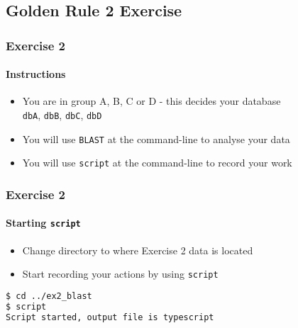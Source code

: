 %

\subsection{Golden Rule 2 Exercise}
\begin{frame}
  \frametitle{Exercise 2}
  \framesubtitle{Instructions}    
  \begin{itemize}
    \item You are in group A, B, C or D - this decides your database\\
    \texttt{dbA}, \texttt{dbB}, \texttt{dbC}, \texttt{dbD}
    \item You will use \texttt{BLAST} at the command-line to analyse your data
    \item You will use \texttt{script} at the command-line to record your work
  \end{itemize}
\end{frame}

\begin{frame}[fragile]
  \frametitle{Exercise 2}
  \framesubtitle{Starting \texttt{script}}    
  \begin{itemize}
    \item Change directory to where Exercise 2 data is located
    \item Start recording your actions by using \texttt{script}
  \end{itemize}
\begin{lstlisting}[language=bash]
$ cd ../ex2_blast
$ script
Script started, output file is typescript
\end{lstlisting}    
\end{frame}


